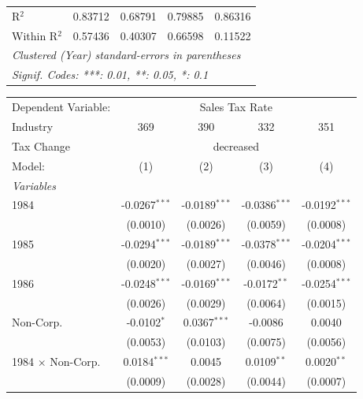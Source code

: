 \documentclass[
  12pt]{article}
\theoremstyle{definition}
\theoremstyle{remark}
\begin{document}
\begin{table}
\begin{minipage}{\linewidth}
\begin{tabular}{lcccc}
   R$^2$                    & 0.83712         & 0.68791        & 0.79885         & 0.86316\\  
   Within R$^2$             & 0.57436         & 0.40307        & 0.66598         & 0.11522\\  
   \midrule \midrule
   \multicolumn{5}{l}{\emph{Clustered (Year) standard-errors in parentheses}}\\
   \multicolumn{5}{l}{\emph{Signif. Codes: ***: 0.01, **: 0.05, *: 0.1}}\\
\end{tabular}
\par\endgroup
\begingroup
\centering
\begin{tabular}{lcccc}
   \tabularnewline \midrule \midrule
   Dependent Variable: & \multicolumn{4}{c}{Sales Tax Rate}\\
   Industry                 & 369             & 390             & 332             & 351 \\   
   Tax Change & \multicolumn{4}{c}{decreased} \\ 
   Model:                   & (1)             & (2)             & (3)             & (4)\\  
   \midrule
   \emph{Variables}\\
   1984                     & -0.0267$^{***}$ & -0.0189$^{***}$ & -0.0386$^{***}$ & -0.0192$^{***}$\\   
                            & (0.0010)        & (0.0026)        & (0.0059)        & (0.0008)\\   
   1985                     & -0.0294$^{***}$ & -0.0189$^{***}$ & -0.0378$^{***}$ & -0.0204$^{***}$\\   
                            & (0.0020)        & (0.0027)        & (0.0046)        & (0.0008)\\   
   1986                     & -0.0248$^{***}$ & -0.0169$^{***}$ & -0.0172$^{**}$  & -0.0254$^{***}$\\   
                            & (0.0026)        & (0.0029)        & (0.0064)        & (0.0015)\\   
   Non-Corp.                & -0.0102$^{*}$   & 0.0367$^{***}$  & -0.0086         & 0.0040\\   
                            & (0.0053)        & (0.0103)        & (0.0075)        & (0.0056)\\   
   1984 $\times$ Non-Corp.  & 0.0184$^{***}$  & 0.0045          & 0.0109$^{**}$   & 0.0020$^{**}$\\   
                            & (0.0009)        & (0.0028)        & (0.0044)        & (0.0007)\\   

\end{tabular}
\end{minipage}
\end{table}
\end{document}

